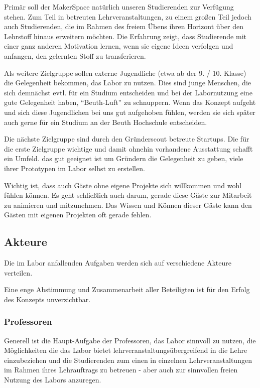 \documentclass[parskip=half,headsepline,footsepline,titlepage]{scrartcl}
\begin{document}
Primär soll der MakerSpace natürlich unseren Studierenden zur Verfügung stehen. Zum Teil in betreuten Lehrveranstaltungen, zu einem großen Teil jedoch auch Studierenden, die im Rahmen des freiem Übens ihren Horizont über den Lehrstoff hinaus erweitern möchten. Die Erfahrung zeigt, dass Studierende mit einer ganz anderen Motivation lernen, wenn sie eigene Ideen verfolgen und anfangen, den gelernten Stoff zu transferieren.

\label{p:zielgruppe-extern}Als weitere Zielgruppe sollen externe Jugendliche (etwa ab der 9. / 10. Klasse) die Gelegenheit bekommen, das Labor zu nutzen. Dies sind junge Menschen, die sich demnächst evtl. für ein Studium entscheiden und bei der Labornutzung eine gute Gelegenheit haben, ``Beuth-Luft'' zu schnuppern. Wenn das Konzept aufgeht und sich diese Jugendlichen bei uns gut aufgehoben fühlen, werden sie sich später auch gerne für ein Studium an der Beuth Hochschule entscheiden.

Die nächste Zielgruppe sind durch den Gründerscout betreute Startups. Die für die erste Zielgruppe wichtige und damit ohnehin vorhandene Ausstattung schafft ein Umfeld. das gut geeignet ist um Gründern die Gelegenheit zu geben, viele ihrer Prototypen im Labor selbst zu erstellen.

Wichtig ist, dass auch Gäste ohne eigene Projekte sich willkommen und wohl fühlen können. Es geht schließlich auch darum, gerade diese Gäste zur Mitarbeit zu animieren und mitzunehmen. Das Wissen und Können dieser Gäste kann den Gästen mit eigenen Projekten oft gerade fehlen.

\subsection{Akteure}
Die im Labor anfallenden Aufgaben werden sich auf verschiedene Akteure verteilen. 

Eine enge Abstimmung und Zusammenarbeit aller Beteiligten ist für den Erfolg des Konzepts unverzichtbar.

\subsubsection{Professoren}

Generell ist die Haupt-Aufgabe der Professoren, das Labor sinnvoll zu nutzen, die Möglichkeiten die das Labor bietet lehrveranstaltungsübergreifend in die Lehre einzubeziehen und die Studierenden zum einen in einzelnen Lehrveranstaltungen im Rahmen ihres Lehrauftrags zu betreuen - aber auch zur sinnvollen freien Nutzung des Labors anzuregen.
\end{document}

